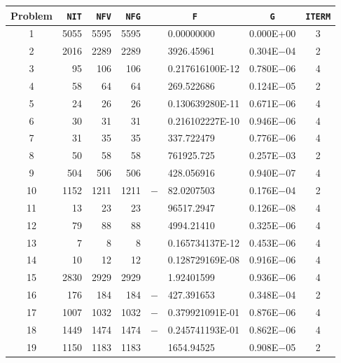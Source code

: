 \documentclass{esub2acm}
\begin{document}
\begin{table}
\footnotesize
\centering
\begin{tabular}{c|rrrr@{}lcc} \hline
Problem\rule[-2pt]{0pt}{12pt} & {\tt NIT} & {\tt NFV} & {\tt NFG} & \multicolumn{2}{c}{\tt F} & {\tt G} & {\tt ITERM} \\ \hline
1\rule[-2pt]{0pt}{12pt} &   5055    &   5595    &   5595    &       &   0.00000000  &   0.000E+00   &   3   \\
2   &   2016    &   2289    &   2289    &       &   3926.45961  &   0.304E$-$04 &   2   \\
3   &   95  &   106 &   106 &       &   0.217616100E-12 &   0.780E$-$06 &   4   \\
4   &   58  &   64  &   64  &       &   269.522686  &   0.124E$-$05 &   2   \\
5   &   24  &   26  &   26  &       &   0.130639280E-11 &   0.671E$-$06 &   4   \\
6   &   30  &   31  &   31  &       &   0.216102227E-10 &   0.946E$-$06 &   4   \\
7   &   31  &   35  &   35  &       &   337.722479  &   0.776E$-$06 &   4   \\
8   &   50  &   58  &   58  &       &   761925.725  &   0.257E$-$03 &   2   \\
9   &   504 &   506 &   506 &       &   428.056916  &   0.940E$-$07 &   4   \\
10  &   1152    &   1211    &   1211    &   $-$ &   82.0207503  &   0.176E$-$04 &   2   \\
11  &   13  &   23  &   23  &       &   96517.2947  &   0.126E$-$08 &   4   \\
12  &   79  &   88  &   88  &       &   4994.21410  &   0.325E$-$06 &   4   \\
13  &   7   &   8   &   8   &       &   0.165734137E-12 &   0.453E$-$06 &   4   \\
14  &   10  &   12  &   12  &       &   0.128729169E-08 &   0.916E$-$06 &   4   \\
15  &   2830    &   2929    &   2929    &       &   1.92401599  &   0.936E$-$06 &   4   \\
16  &   176 &   184 &   184 &   $-$ &   427.391653  &   0.348E$-$04 &   2   \\
17  &   1007    &   1032    &   1032    &   $-$ &   0.379921091E-01 &   0.876E$-$06 &   4   \\
18  &   1449    &   1474    &   1474    &   $-$ &   0.245741193E-01 &   0.862E$-$06 &   4   \\
19  &   1150    &   1183    &   1183    &       &   1654.94525  &   0.908E$-$05 &   2   \\

\end{tabular}
\end{table}
\end{document}
